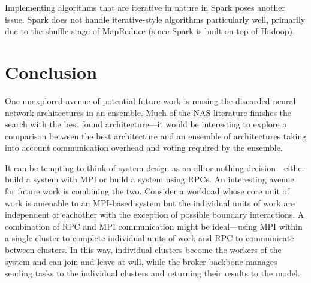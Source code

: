 \documentclass[conference]{IEEEtran}
\begin{document}
Implementing algorithms that are iterative in nature in Spark poses another
issue. Spark does not handle iterative-style algorithms particularly well,
primarily due to the shuffle-stage of MapReduce (since Spark is built on
top of Hadoop).

\section{Conclusion}
One unexplored avenue of potential future work is reusing the discarded
neural network architectures in an ensemble. Much of the NAS literature
finishes the search with the best found architecture---it would be interesting
to explore a comparison between the best architecture and an ensemble of
architectures taking into account communication overhead and voting required
by the ensemble.

It can be tempting to think of system design as an all-or-nothing
decision---either build a system with MPI or build a system using RPCs. An
interesting avenue for future work is combining the two. Consider a workload
whose core unit of work is amenable to an MPI-based system but the individual
units of work are independent of eachother with the exception of possible
boundary interactions. A combination of RPC and MPI communication might be
ideal---using MPI within a single cluster to complete individual units of work
and RPC to communicate between clusters. In this way, individual clusters become
the workers of the system and can join and leave at will, while the broker
backbone manages sending tasks to the individual clusters and returning their
results to the model.
\balance


\end{document}
